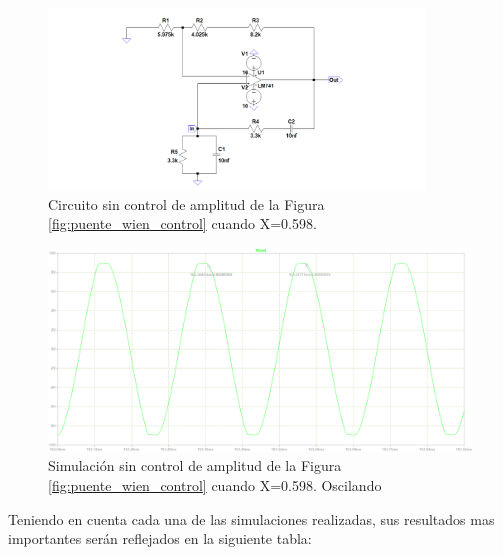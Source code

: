\begin{enumerate}
\begin{itemize}
                    \begin{figure}[H]
                        \centering
                        \setcounter{figure}{8}
                        \includegraphics[width=10cm]{Imagenes/sim_cir_puente_wien_sc402.png}
                        \caption{Circuito sin control de amplitud de la Figura \ref{fig:puente_wien_control} cuando X=0.598.}
                        \label{fig:sim_cir_puente_wien_sc402}
                    \end{figure}

                    \begin{figure}[H]
                        \centering
                        \renewcommand{\figurename}{Gráfica}
                        \setcounter{figure}{4}
                        \includegraphics[width=15cm]{Imagenes/sim_puente_wien_sc402.png}
                        \caption{Simulación sin control de amplitud de la Figura \ref{fig:puente_wien_control} cuando X=0.598. Oscilando}
                        \label{fig:sim_puente_wien_sc402}
                    \end{figure}

                    Teniendo en cuenta cada una de las simulaciones realizadas, sus resultados mas importantes serán reflejados en la siguiente tabla:


\end{itemize}
\end{enumerate}
